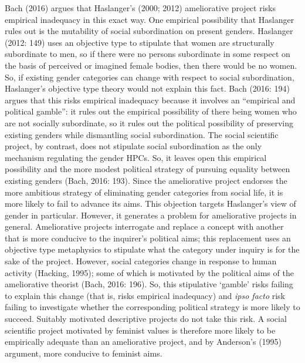 Bach (2016) argues that Haslanger's (2000; 2012) ameliorative project
risks empirical inadequacy in this exact way. One empirical possibility
that Haslanger rules out is the mutability of social subordination on
present genders. Haslanger (2012: 149) uses an objective type to
stipulate that women are structurally subordinate to men, so if there
were no persons subordinate in some respect on the basis of perceived or
imagined female bodies, then there would be no women. So, if existing
gender categories can change with respect to social subordination,
Haslanger's objective type theory would not explain this fact. Bach
(2016: 194) argues that this risks empirical inadequacy because it
involves an ``empirical and political gamble'': it rules out the
empirical possibility of there being women who are not socially
subordinate, so it rules out the political possibility of preserving
existing genders while dismantling social subordination. The social
scientific project, by contrast, does not stipulate social subordination
as the only mechanism regulating the gender HPCs. So, it leaves open
this empirical possibility and the more modest political strategy of
pursuing equality between existing genders (Bach, 2016: 193). Since the
ameliorative project endorses the more ambitious strategy of eliminating
gender categories from social life, it is more likely to fail to advance
its aims. This objection targets Haslanger's view of gender in
particular. However, it generates a problem for ameliorative projects in
general. Ameliorative projects interrogate and replace a concept with
another that is more conducive to the inquirer's political aims; this
replacement uses an objective type metaphysics to stipulate what the
category under inquiry is for the sake of the project. However, social
categories change in response to human activity (Hacking, 1995); some of
which is motivated by the political aims of the ameliorative theorist
(Bach, 2016: 196). So, this stipulative `gamble' risks failing to
explain this change (that is, risks empirical inadequacy) and \emph{ipso
facto} risk failing to investigate whether the corresponding political
strategy is more likely to succeed. Suitably motivated descriptive
projects do not take this risk. A social scientific project motivated by
feminist values is therefore more likely to be empirically adequate than
an ameliorative project, and by Anderson's (1995) argument, more
conducive to feminist aims.

